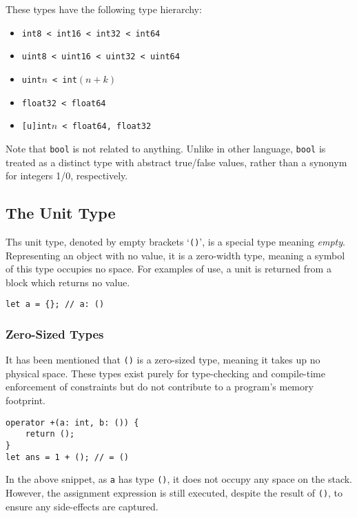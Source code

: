 These types have the following type hierarchy:
\begin{itemize}
    \item \texttt{int8 < int16 < int32 < int64}
    \item \texttt{uint8 < uint16 < uint32 < uint64}
    \item \texttt{uint\(n\) < int\((n+k)\)}
    \item \texttt{float32 < float64}
    \item \texttt{[u]int\(n\) < float64, float32}
\end{itemize}

Note that \texttt{bool} is not related to anything.
Unlike in other language, \texttt{bool} is treated as a distinct type with abstract true/false values, rather than a synonym for integers 1/0, respectively.

\subsection{The Unit Type}

Ths unit type, denoted by empty brackets `\texttt{()}', is a special type meaning \textit{empty}.
Representing an object with no value, it is a zero-width type, meaning a symbol of this type occupies no space.
For examples of use, a unit is returned from a block which returns no value.

\begin{lstlisting}[language=CustomLang]
let a = {}; // a: ()
\end{lstlisting}

\subsubsection{Zero-Sized Types}

It has been mentioned that \texttt{()} is a zero-sized type, meaning it takes up no physical space.
These types exist purely for type-checking and compile-time enforcement of constraints but do not contribute to a program's memory footprint.

\begin{lstlisting}[language=CustomLang]
operator +(a: int, b: ()) {
    return ();
}
let ans = 1 + (); // = ()
\end{lstlisting}

In the above snippet, as \texttt{a} has type \texttt{()}, it does not occupy any space on the stack.
However, the assignment expression is still executed, despite the result of \texttt{()}, to ensure any side-effects are captured.

